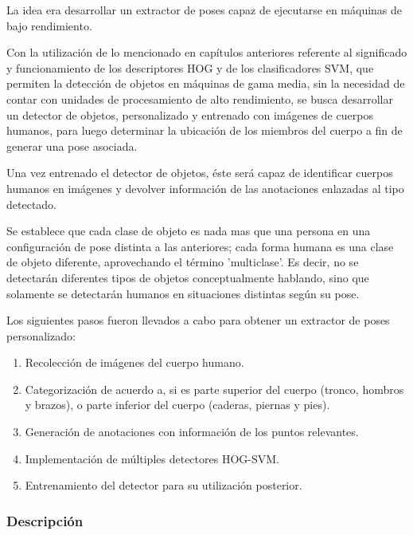 \documentclass[a4paper,12pt,oneside,spanish]{book}
\begin{document}
La idea era desarrollar un extractor de poses capaz de ejecutarse en máquinas de bajo rendimiento.\par

Con la utilización de lo mencionado en capítulos anteriores referente al significado y funcionamiento de los descriptores HOG y de los clasificadores SVM, que permiten la detección de objetos en máquinas de gama media, sin la necesidad de contar con unidades de procesamiento de alto rendimiento, se busca desarrollar un detector de objetos, personalizado y entrenado con imágenes de cuerpos humanos, para luego determinar la ubicación de los miembros del cuerpo a fin de generar una pose asociada.\par

Una vez entrenado el detector de objetos, éste será capaz de identificar cuerpos humanos en imágenes y devolver información de las anotaciones enlazadas al tipo detectado. \par

Se establece que cada clase de objeto es nada mas que una persona en una configuración de pose distinta a las anteriores; cada forma humana es una clase de objeto diferente, aprovechando el término 'multiclase'. Es decir, no se detectarán diferentes tipos de objetos conceptualmente hablando, sino que solamente se detectarán humanos en situaciones distintas según su pose. \par

Los siguientes pasos fueron llevados a cabo para obtener un extractor de poses personalizado:

\begin{enumerate}
	\setlength\itemsep{-0.2em}
	\item Recolección de imágenes del cuerpo humano.
	\item Categorización de acuerdo a, si es parte superior del cuerpo (tronco, hombros y brazos), o parte inferior del cuerpo (caderas, piernas y pies).
	\item Generación de anotaciones con información de los puntos relevantes.
	\item Implementación de múltiples detectores HOG-SVM.
	\item Entrenamiento del detector para su utilización posterior.
\end{enumerate}

\subsubsection{Descripción}
\end{document}
